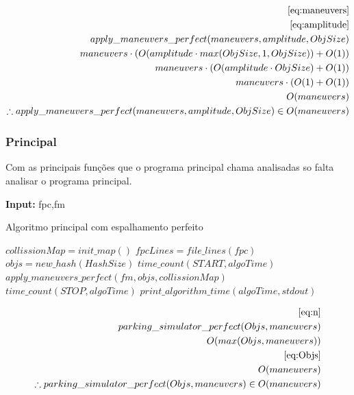 \documentclass[11pt]{article}
\begin{document}
\begin{equation}
\begin{aligned}
\eqref{eq:maneuvers}\\
\eqref{eq:amplitude}\\
apply\_maneuvers\_perfect(maneuvers,amplitude,ObjSize)\\
maneuvers\cdot (O(amplitude\cdot max(ObjSize,1,ObjSize))+O(1))\\
maneuvers\cdot (O(amplitude\cdot ObjSize)+O(1))\\
maneuvers\cdot (O(1)+O(1))\\
O(maneuvers)\\
\therefore apply\_maneuvers\_perfect(maneuvers,amplitude,ObjSize) \in O(maneuvers)\\
\end{aligned}
\end{equation}


\subsubsection{Principal}
\label{sec:org9ae556b}
Com as principais funções que o programa principal chama analisadas so falta analisar o programa principal. 

\begin{algorithm}
\textbf{Input:} fpc,fm
\caption{Algoritmo principal com espalhamento perfeito}\label{algorithmdpsmudar}
\begin{algorithmic}[1]
\State $collissionMap = init\_map()$
\State $fpcLines = file\_lines(fpc)$
\State $objs = new\_hash(HashSize)$
\State $time\_count(START,algoTime)$
\State $apply\_maneuvers\_perfect(fm,objs,collissionMap)$
\State $time\_count(STOP,algoTime)$
\State $print\_algorithm\_time(algoTime,stdout)$
\EndIf
\EndProcedure
\end{algorithmic}
\end{algorithm}

\begin{equation}
\begin{aligned}
\eqref{eq:n}\\
parking\_simulator\_perfect(Objs,maneuvers)\\
O(max(Objs,maneuvers))\\
\eqref{eq:Objs}\\
O(maneuvers)\\
\therefore parking\_simulator\_perfect(Objs,maneuvers) \in O(maneuvers)\\
\end{aligned}
\end{equation}
\end{document}
